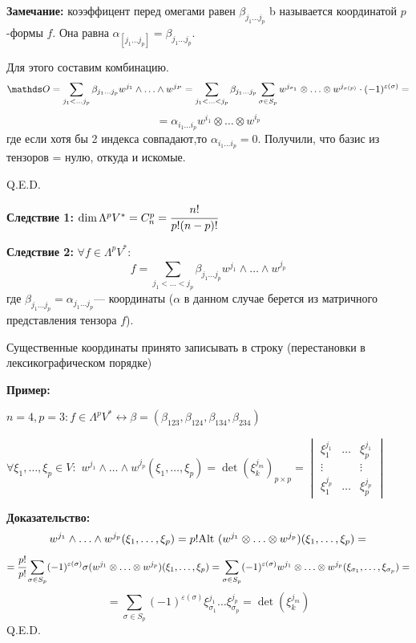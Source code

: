 \textbf{Замечание:} коээффицент перед омегами равен $\beta_{j_1\ldots j_p}$ b называется  координатой $p$-формы $f$.  Она равна $\alpha_{[j_1\ldots j_p]}=\beta_{j_1\ldots j_p}$. 


Для этого составим комбинацию. 
$$\zero=\sum\limits_{j_1 <\ldots j_p}\beta_{j_1\ldots j_p} w^{j_1}\wedge \ldots \wedge w^{j_P}= 
\sum\limits_{j_1 < \ldots <j_p} \beta_{j_1\ldots j_p}\sum_{\sigma \in S_p} w^{j_{\sigma_1}}\otimes\ldots\otimes w^{j_{\sigma(p)}} \cdot (-1)^{\varepsilon(\sigma)} = $$
$$= \alpha_{i_1\ldots i_p} w^{i_1}\otimes \ldots \otimes w^{i_p}$$
где если хотя бы 2 индекса совпадают,то $\alpha_{i_1\ldots i_p} = 0$. Получили, что базис из тензоров = нулю, откуда и искомые.

\hfill Q.E.D.

\textbf{Следствие 1:} $\dim \Lambda^pV^* = C^p_n = \cfrac{n!}{p!(n-p)!}$

\textbf{Следствие 2:} $\forall f \in \Lambda^p V^*:$
$$f = \sum\limits_{j_1<\ldots <j_p} \beta_{j_1\ldots j_p}w^{j_1}\wedge \ldots \wedge w^{j_p}$$
где $\beta_{j_1\ldots j_p} = \alpha_{j_1\ldots j_p}$--- 
 координаты ($\alpha$ в данном случае берется из матричного представления тензора $f$).



Существенные координаты принято записывать в строку
(перестановки в лексикографическом порядке)

\textbf{Пример:}

$n=4, p=3: f\in \Lambda^{p}V^* \leftrightarrow \beta = (\beta_{123},\beta_{124},\beta_{134}, \beta_{234})$


$\forall \xi_1,\ldots, \xi_p \in V:$ $w^{j_1}\wedge \ldots \wedge w^{j_p} (\xi_1,\ldots,\xi_p) = \det(\xi^{j_m}_k)_{p\times p} = \begin{vmatrix}
    \xi_1^{j_1} & \ldots & \xi_p^{j_1}\\
    \vdots & & \vdots \\
    \xi_1^{j_p} & \ldots & \xi_p^{j_p}
\end{vmatrix}$

\textbf{Доказательство:}
$$w^{j_1}\wedge \ldots \wedge w^{j_p} (\xi_1,\ldots,\xi_p) = p! \text{Alt } (w^{j_1}\otimes \ldots  \otimes w^{j_p})(\xi_1,\ldots,\xi_p) =$$
$$=\cfrac{p!}{p!} \sum\limits_{\sigma \in S_p}(-1)^{\varepsilon(\sigma)}\sigma(w^{j_1}\otimes \ldots \otimes w^{j_p})(\xi_1,\ldots,\xi_p) = \sum_{\sigma \in S_p} (-1)^{\varepsilon(\sigma)}w^{j_1}\otimes \ldots \otimes w^{j_p}(\xi_{\sigma_1},\ldots ,\xi_{\sigma_p}) = $$
$$= \sum\limits_{\sigma\in S_p}(-1)^{\varepsilon(\sigma)}\xi_{\sigma_1}^{j_1}\ldots \xi_{\sigma_p}^{j_p} = \det(\xi_k^{j_m})$$
\hfill Q.E.D.


